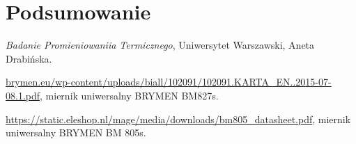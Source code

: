 \documentclass[12pt]{article}
\begin{document}
\section{Podsumowanie}



\newpage

\begin{thebibliography}{3}

\emph{Badanie Promieniowaniia Termicznego}, Uniwersytet Warszawski, Aneta Drabińska.

\url{brymen.eu/wp-content/uploads/biall/102091/102091.KARTA_EN..2015-07-08.1.pdf}, miernik uniwersalny BRYMEN BM827s.

\url{https://static.eleshop.nl/mage/media/downloads/bm805_datasheet.pdf}, miernik uniwersalny BRYMEN BM 805s.
\end{thebibliography}
\end{document}

